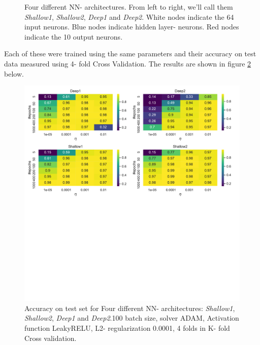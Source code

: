 \documentclass[11pt,a4paper,titlepage]{article}
\def\layersep{2.5cm}
\def\layersepSmall{1.2cm}
\begin{document}
\begin{figure}[H]
\caption[NN architectures]{Four different NN- architectures. From left to right, we'll call them \textit{Shallow1}, \textit{Shallow2}, \textit{Deep1} and \textit{Deep2}. White nodes indicate the 64 input neurons. Blue nodes indicate hidden layer- neurons. Red nodes indicate the 10 output neurons.}
\label{NNarchitectures}
\end{figure}
Each of these were trained using the same parameters and their accuracy on test data measured using 4- fold Cross Validation. The results are shown in figure \ref{TinyTableArchitect} below.

\begin{figure}[H]
\centering

\includegraphics[trim=0cm 12.0cm 0cm 0.0cm, clip=true,scale = 0.6]{Architecture_d.pdf}
\caption[NN architectures Accuracy]{Accuracy on test set for Four different NN- architectures: \textit{Shallow1}, \textit{Shallow2}, \textit{Deep1} and \textit{Deep2}.100 batch size, solver ADAM, Activation function LeakyRELU, L2- regularization 0.0001, 4 folds in K- fold Cross validation.}\label{TinyTableArchitect}
\end{figure}
\end{document}

